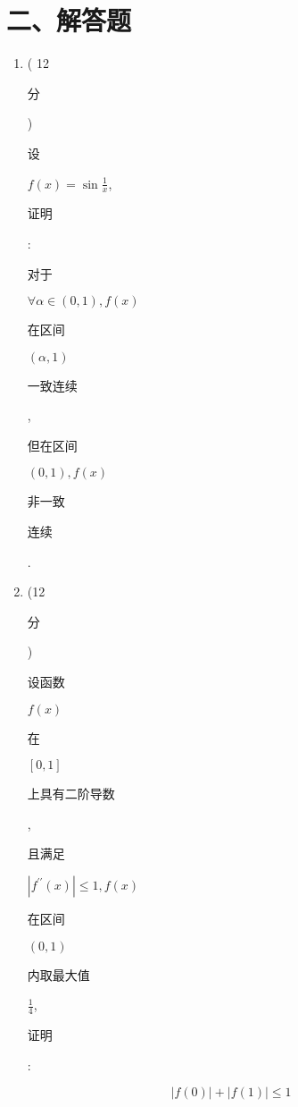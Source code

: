 \documentclass[10pt]{article}
\begin{document}
\section{二、解答题}
\begin{enumerate}
  \item ( 12 \begin{CJK}{UTF8}{mj}分\end{CJK}) \begin{CJK}{UTF8}{mj}设\end{CJK} $f(x)=\sin \frac{1}{x}$, \begin{CJK}{UTF8}{mj}证明\end{CJK}: \begin{CJK}{UTF8}{mj}对于\end{CJK} $\forall \alpha \in(0,1), f(x)$ \begin{CJK}{UTF8}{mj}在区间\end{CJK} $(\alpha, 1)$ \begin{CJK}{UTF8}{mj}一致连续\end{CJK}, \begin{CJK}{UTF8}{mj}但在区间\end{CJK} $(0,1), f(x)$ \begin{CJK}{UTF8}{mj}非一致\end{CJK} \begin{CJK}{UTF8}{mj}连续\end{CJK}.

  \item (12 \begin{CJK}{UTF8}{mj}分\end{CJK}) \begin{CJK}{UTF8}{mj}设函数\end{CJK} $f(x)$ \begin{CJK}{UTF8}{mj}在\end{CJK} $[0,1]$ \begin{CJK}{UTF8}{mj}上具有二阶导数\end{CJK}, \begin{CJK}{UTF8}{mj}且满足\end{CJK} $\left|f^{\prime \prime}(x)\right| \leqslant 1, f(x)$ \begin{CJK}{UTF8}{mj}在区间\end{CJK} $(0,1)$ \begin{CJK}{UTF8}{mj}内取最大值\end{CJK} $\frac{1}{4}$, \begin{CJK}{UTF8}{mj}证明\end{CJK}:

\end{enumerate}
$$
|f(0)|+|f(1)| \leqslant 1
$$
\end{document}
